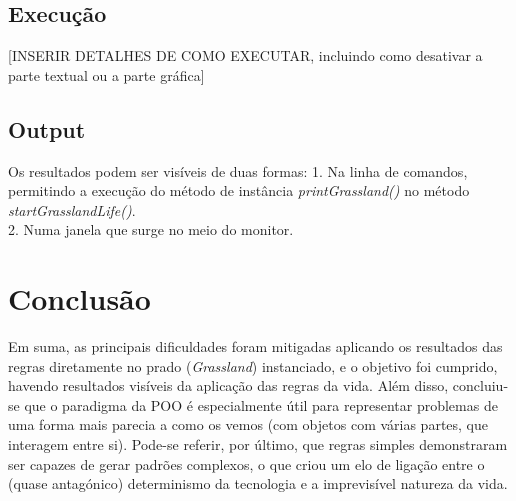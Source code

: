 \documentclass {report}
\begin{document}
\subsection*{Execução}
[INSERIR DETALHES DE COMO EXECUTAR, incluindo como desativar a parte textual ou a parte gráfica]


\subsection*{Output}
Os resultados podem ser visíveis de duas formas:
1. Na linha de comandos, permitindo a execução do método de instância \textit{printGrassland()} no método \textit{startGrasslandLife()}.\\
2. Numa janela que surge no meio do monitor.\\


\section*{Conclusão}
Em suma, as principais dificuldades foram mitigadas aplicando os resultados das regras diretamente no prado (\textit{Grassland}) instanciado, 
e o objetivo foi cumprido, havendo resultados visíveis da aplicação das regras da vida.
Além disso, concluiu-se que o paradigma da POO é especialmente útil para representar problemas 
de uma forma mais parecia a como os vemos (com objetos com várias partes, que interagem entre si).
Pode-se referir, por último, que regras simples demonstraram ser capazes de gerar padrões complexos, 
o que criou um elo de ligação entre o (quase antagónico) determinismo da tecnologia e a imprevisível natureza da vida.

\clearpage %

\end{document}
